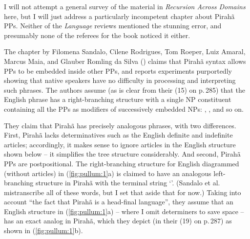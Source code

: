 \documentclass[output=paper,colorlinks,citecolor=brown
]{langscibook}
\begin{document}
I will not attempt a general survey of the material in
\textit{Recursion Across Domains} here, but I will just address a
particularly incompetent chapter about Pirah{\~a} PPs. Neither of
the \textit{Language} reviews mentioned the stunning error, and
presumably none of the referees for the book noticed it either.

The chapter by Filomena Sandalo, Cilene Rodrigues, Tom Roeper, Luiz Amaral,
Marcus Maia, and Glauber Romling da Silva (\citeyear{SandaloEtAl18})
claims that Pirah{\~a} syntax allows PPs to be embedded inside other PPs,
and reports experiments purportedly showing that native speakers have no
difficulty in processing and interpreting such phrases. The authors assume
(as is clear from their (15) on p.\,285) that the English phrase
 has a
right-branching structure with a single NP constituent containing
all the PPs as modifiers of successively embedded NPs:
,
, and so on.

They claim that Pirah{\~a} has precisely analogous phrases, with two
differences. First, Pirah{\~a} lacks determinatives such as the English
definite and indefinite articles; accordingly, it makes sense to ignore
articles in the English structure shown below -- it simplifies the tree
structure considerably.  And second, Pirah{\~a} PPs are postpositional.
The right-branching structure for English diagrammed (without articles)
in (\ref{fig:pullum:1}a) is claimed to have an analogous left-branching structure in
Pirah{\~a} with the terminal string `'. (Sandalo et al. mistranscribe all of these
words, but I set that aside that for now.) Taking into account ``the
fact that Pirah{\~a} is a head-final language'', they assume that an
English structure in (\ref{fig:pullum:1}a) -- where I omit determiners to save space
-- has an exact analog in Pirah{\~a}, which they depict
(in their (19) on p.\,287) as shown in (\ref{fig:pullum:1}b).
\end{document}

